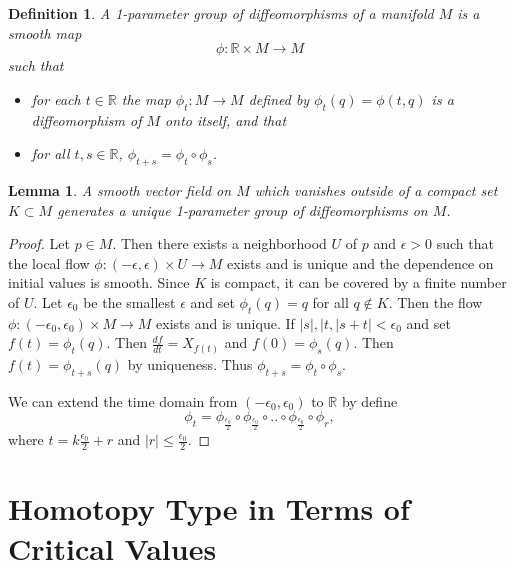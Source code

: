 \documentclass[a4paper,11pt,reqno]{amsart}
\newtheorem{lem}[thm]{Lemma}
\newtheorem{defn}[thm]{Definition}
\newcommand{\RR}{\mathbb{R}}      %
\begin{document}
\begin{defn}
  A 1-parameter group of diffeomorphisms of a manifold $M$ is a smooth map
  \begin{equation}
    \phi : \RR \times M \to M
  \end{equation}
  such that
  \begin{itemize}
  \item for each $t \in \RR$ the map $\phi_t : M \to M$ defined by $\phi_t(q) =
    \phi(t, q)$ is a diffeomorphism of $M$ onto itself, and that
  \item for all $t,s \in \RR$, $\phi_{t+s} = \phi_t \circ \phi_s$.
  \end{itemize}
\end{defn}

\begin{lem}
  A smooth vector field on $M$ which vanishes outside of a compact set $K
  \subset M$ generates a unique 1-parameter group of diffeomorphisms on $M$.
\end{lem}

\begin{proof}
  Let $p \in M$. Then there exists a neighborhood $U$ of $p$ and $\epsilon > 0$
  such that the local flow $\phi : (-\epsilon, \epsilon)\times U \to M$ exists
  and is unique and the dependence on initial values is smooth. Since $K$ is
  compact, it can be covered by a finite number of $U$. Let $\epsilon_0$ be the
  smallest $\epsilon$ and set $\phi_t(q) = q$ for all $q \notin K$. Then the
  flow $\phi: (-\epsilon_0, \epsilon_0)\times M \to M$ exists and is unique. If
  $|s|,|t,|s+t| < \epsilon_0$ and set $f(t) = \phi_t(q)$. Then $\frac{df}{dt} =
  X_{f(t)}$ and $f(0) = \phi_s(q)$. Then $f(t) = \phi_{t+s}(q)$ by
  uniqueness. Thus $\phi_{t+s} = \phi_t \circ \phi_s$.

  We can extend the time domain from $(-\epsilon_0, \epsilon_0)$ to $\RR$ by
  define
  \begin{equation}
    \phi_t = \phi_{\frac{\epsilon_0}{2}} \circ \phi_{\frac{\epsilon_0}{2}} \circ
    .. \circ \phi_{\frac{\epsilon_0}{2}} \circ \phi_r,
  \end{equation}
  where $t = k\frac{\epsilon_0}{2}+ r$ and $|r| \le \frac{\epsilon_0}{2}$.
\end{proof}

\section{Homotopy Type in Terms of Critical Values}
\end{document}
